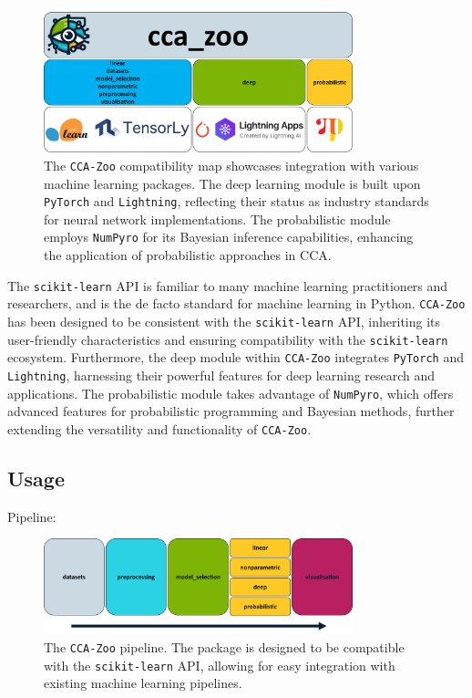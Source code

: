 \begin{figure}[ht]
    \centering
    \includegraphics[width=0.8\textwidth]{figures/CCA_Zoo_map}
    \caption[The \texttt{CCA-Zoo} compatibility map]{The \texttt{CCA-Zoo} compatibility map showcases integration with various machine learning packages. The deep learning module is built upon \texttt{PyTorch} and \texttt{Lightning}, reflecting their status as industry standards for neural network implementations. The probabilistic module employs \texttt{NumPyro} for its Bayesian inference capabilities, enhancing the application of probabilistic approaches in CCA.}
    \label{fig:cca-zoo-api}
\end{figure}

The \texttt{scikit-learn} API is familiar to many machine learning practitioners and researchers, and is the de facto standard for machine learning in Python. \texttt{CCA-Zoo} has been designed to be consistent with the \texttt{scikit-learn} API, inheriting its user-friendly characteristics and ensuring compatibility with the \texttt{scikit-learn} ecosystem. Furthermore, the deep module within \texttt{CCA-Zoo} integrates \texttt{PyTorch} and \texttt{Lightning}, harnessing their powerful features for deep learning research and applications. The probabilistic module takes advantage of \texttt{NumPyro}, which offers advanced features for probabilistic programming and Bayesian methods, further extending the versatility and functionality of \texttt{CCA-Zoo}.


\subsection{Usage}

Pipeline:

\begin{figure}[ht]
    \centering
    \includegraphics[width=0.8\textwidth]{figures/pipeline}
    \caption[The \texttt{CCA-Zoo} pipeline]{The \texttt{CCA-Zoo} pipeline. The package is designed to be compatible with the \texttt{scikit-learn} API, allowing for easy integration with existing machine learning pipelines.}\label{fig:cca-zoo-pipeline}
\end{figure}

